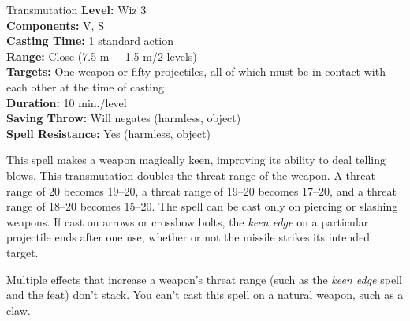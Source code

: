 {Transmutation}
{
	\textbf{Level:}
	Wiz 3\\
	\textbf{Components:}
	V, S\\
	\textbf{Casting Time:}
	1 standard action\\
	\textbf{Range:}
	Close (7.5 m + 1.5 m/2 levels)\\
	\textbf{Targets:}
	One weapon or fifty projectiles, all of which must be in contact with each other at the time of casting\\
	\textbf{Duration:}
	10 min./level\\
	\textbf{Saving Throw:}
	Will negates (harmless, object)\\
	\textbf{Spell Resistance:}
	Yes (harmless, object)\\
}
{
	This spell makes a weapon magically keen, improving its ability to deal telling blows. This transmutation doubles the threat range of the weapon. A threat range of 20 becomes 19--20, a threat range of 19--20 becomes 17--20, and a threat range of 18--20 becomes 15--20. The spell can be cast only on piercing or slashing weapons. If cast on arrows or crossbow bolts, the \emph{keen edge} on a particular projectile ends after one use, whether or not the missile strikes its intended target.

	Multiple effects that increase a weapon's threat range (such as the \emph{keen edge} spell and the  feat) don't stack. You can't cast this spell on a natural weapon, such as a claw.

}
